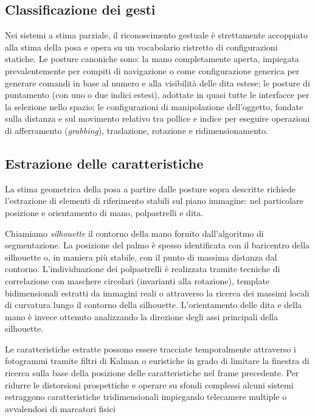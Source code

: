\subsection{Classificazione dei gesti}

Nei sistemi a stima parziale, il riconoscimento gestuale è strettamente accoppiato alla stima della posa e opera su un vocabolario ristretto di configurazioni statiche.
Le posture canoniche sono:
la mano completamente aperta, impiegata prevalentemente per compiti di navigazione o come configurazione generica per generare comandi in base al numero e alla visibilità delle dita estese;
le posture di puntamento (con uno o due indici estesi), adottate in quasi tutte le interfacce per la selezione nello spazio;
le configurazioni di manipolazione dell'oggetto, fondate sulla distanza e sul movimento relativo tra pollice e indice per eseguire operazioni di afferramento (\emph{grabbing}), traslazione, rotazione e ridimensionamento.



\subsection{Estrazione delle caratteristiche}

La stima geometrica della posa a partire dalle posture sopra descritte richiede l'es\-tra\-zio\-ne di elementi di riferimento stabili sul piano immagine:
nel particolare posizione e orientamento di mano, polpastrelli e dita.

Chiamiamo \emph{silhouette} il contorno della mano fornito dall'algoritmo di segmentazione.
La posizione del palmo è spesso identificata con il baricentro della silhouette o, in maniera più stabile, con il punto di massima distanza dal contorno.
L'individuazione dei polpastrelli è realizzata tramite tecniche di correlazione con maschere circolari (invarianti alla rotazione), template bidimensionali estratti da immagini reali o attraverso la ricerca dei massimi locali di curvatura lungo il contorno della silhouette.
L'orientamento delle dita e della mano è invece ottenuto analizzando la direzione degli assi principali della silhouette.

Le caratteristiche estratte possono essere tracciate temporalmente attraverso i fotogrammi tramite filtri di Kalman o euristiche in grado di limitare la finestra di ricerca sulla base della posizione delle caratteristiche nel frame precedente. 
Per ridurre le distorsioni prospettiche e operare su sfondi complessi alcuni sistemi estraggono caratteristiche tridimensionali impiegando telecamere multiple o avvalendosi di marcatori fisici


